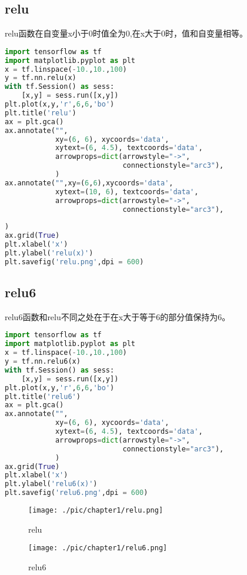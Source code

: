 \subsection{relu}
relu函数在自变量x小于0时值全为0,在x大于0时，值和自变量相等。
\begin{lstlisting}[language=Python]
import tensorflow as tf 
import matplotlib.pyplot as plt 
x = tf.linspace(-10.,10.,100)
y = tf.nn.relu(x)
with tf.Session() as sess:
	[x,y] = sess.run([x,y])
plt.plot(x,y,'r',6,6,'bo')
plt.title('relu')
ax = plt.gca()
ax.annotate("",
            xy=(6, 6), xycoords='data',
            xytext=(6, 4.5), textcoords='data',
            arrowprops=dict(arrowstyle="->",
                            connectionstyle="arc3"),
            )
ax.annotate("",xy=(6,6),xycoords='data',
            xytext=(10, 6), textcoords='data',
            arrowprops=dict(arrowstyle="->",
                            connectionstyle="arc3"),
	  	   
)
ax.grid(True)
plt.xlabel('x')
plt.ylabel('relu(x)')
plt.savefig('relu.png',dpi = 600)
\end{lstlisting}
\subsection{relu6}
relu6函数和relu不同之处在于在x大于等于6的部分值保持为6。
\begin{lstlisting}[language=Python]
import tensorflow as tf 
import matplotlib.pyplot as plt 
x = tf.linspace(-10.,10.,100)
y = tf.nn.relu6(x)
with tf.Session() as sess:
	[x,y] = sess.run([x,y])
plt.plot(x,y,'r',6,6,'bo')
plt.title('relu6')
ax = plt.gca()
ax.annotate("",
            xy=(6, 6), xycoords='data',
            xytext=(6, 4.5), textcoords='data',
            arrowprops=dict(arrowstyle="->",
                            connectionstyle="arc3"),
            )
ax.grid(True)
plt.xlabel('x')
plt.ylabel('relu6(x)')
plt.savefig('relu6.png',dpi = 600)
\end{lstlisting}
\begin{figure}[H]
\centering
\texttt{[image: ./pic/chapter1/relu.png]}
\caption{relu}
\end{figure}
\begin{figure}[H]
\centering
\texttt{[image: ./pic/chapter1/relu6.png]}
\caption{relu6}
\end{figure}

